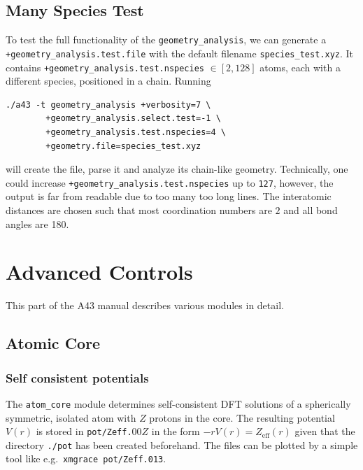 \documentclass[oribibl]{llncs}
\newcommand{\um}[1]{_{\mathrm{#1}}}
\newcommand{\ttt}[1]{\texttt{#1}}
\newcommand{\codename}{A43}
\begin{document}
%
%
\subsection{Many Species Test} \label{sec:many-species-test}
%
To test the full functionality of the \ttt{geometry\_analysis},
we can generate a \ttt{+geometry\_analysis.test.file} 
with the default filename \ttt{species\_test.xyz}.
It contains \ttt{+geometry\_analysis.test.nspecies} $\in [2, 128]$ atoms, each with a
different species, positioned in a chain. Running
\begin{verbatim}
./a43 -t geometry_analysis +verbosity=7 \
        +geometry_analysis.select.test=-1 \
        +geometry_analysis.test.nspecies=4 \
        +geometry.file=species_test.xyz
\end{verbatim}
will create the file, parse it and analyze its chain-like geometry.
Technically, one could increase \ttt{+geometry\_analysis.test.nspecies} up to \ttt{127},
however, the output is far from readable due to too many too long lines.
The interatomic distances are chosen such that most coordination numbers
are $2$ and all bond angles are 180\degree{}.
%

\newpage

\section{Advanced Controls} \label{sec:advanced-controls}
%
This part of the \codename{} manual describes various modules in detail.


\subsection{Atomic Core} \label{sec:atom-core}
%
\subsubsection{Self consistent potentials}
%
The \ttt{atom\_core} module determines self-consistent \ac{DFT} solutions
of a spherically symmetric, isolated atom with $Z$ protons in the core.
The resulting potential $V(r)$ is stored in \ttt{pot/Zeff.}$00Z$
in the form $-rV(r) = Z\um{eff}(r)$ given that the directory \ttt{./pot} has been created beforehand.
The files can be plotted by a simple tool like e.g.~\ttt{xmgrace pot/Zeff.013}.
\end{document}
